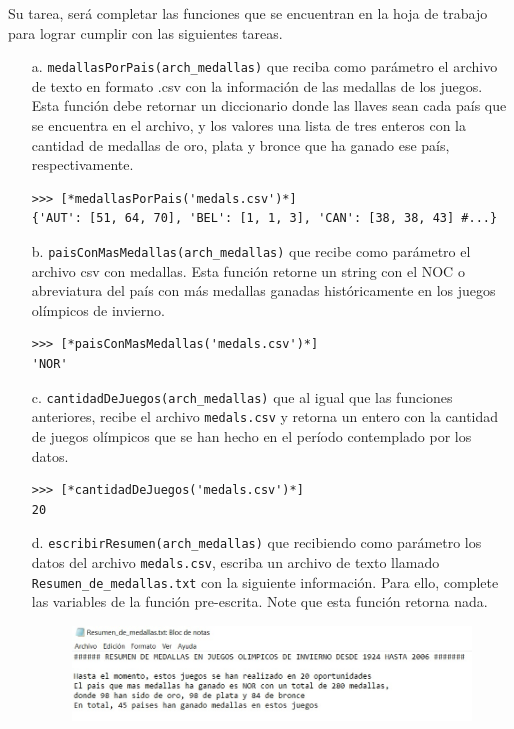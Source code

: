 Su tarea, será completar las funciones que se encuentran en la hoja de trabajo para lograr cumplir con las siguientes tareas.

\begin{itemize}
    \item[a.] \texttt{medallasPorPais(arch\_medallas)} que reciba como parámetro el archivo de texto en formato .csv con la información de las medallas de los juegos. Esta función debe retornar un diccionario donde las llaves sean cada país que se encuentra en el archivo, y los valores una lista de tres enteros con la cantidad de medallas de oro, plata y bronce que ha ganado ese país, respectivamente.
\begin{lstlisting}[style=consola]
>>> [*medallasPorPais('medals.csv')*]
{'AUT': [51, 64, 70], 'BEL': [1, 1, 3], 'CAN': [38, 38, 43] #...}
\end{lstlisting}

    \item[b.] \texttt{paisConMasMedallas(arch\_medallas)} que recibe como parámetro el archivo csv con medallas. Esta función retorne un string con el NOC o abreviatura del país con más medallas ganadas históricamente en los juegos olímpicos de invierno.
\begin{lstlisting}[style=consola]
>>> [*paisConMasMedallas('medals.csv')*]
'NOR'
\end{lstlisting}
    \item[c.] \texttt{cantidadDeJuegos(arch\_medallas)} que al igual que las funciones anteriores, recibe el archivo \texttt{medals.csv} y retorna un entero con la cantidad de juegos olímpicos que se han hecho en el período contemplado por los datos.
\begin{lstlisting}[style=consola]
>>> [*cantidadDeJuegos('medals.csv')*]
20
\end{lstlisting}
    \item[d.] \texttt{escribirResumen(arch\_medallas)} que recibiendo como parámetro los datos del archivo \texttt{medals.csv}, escriba un archivo de texto llamado \texttt{Resumen\_de\_medallas.txt} con la siguiente información. Para ello, complete las variables de la función pre-escrita. Note que esta función retorna nada.
\begin{figure}[H]
    \centering
    \includegraphics[width=\textwidth]{Guia/resumen.jpg}
\end{figure}
\end{itemize}